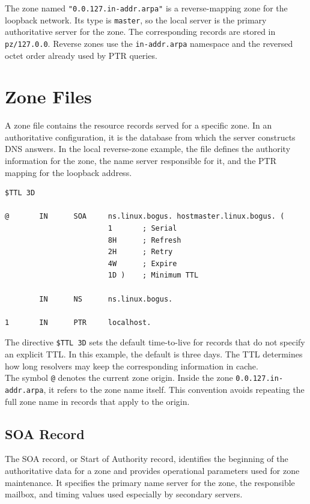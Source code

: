 \documentclass{scrbook}
\begin{document}
	The zone named \texttt{"0.0.127.in-addr.arpa"} is a reverse-mapping zone for the loopback network. Its type is \texttt{master}, so the local server is the primary authoritative server for the zone. The corresponding records are stored in \texttt{pz/127.0.0}. Reverse zones use the \texttt{in-addr.arpa} namespace and the reversed octet order already used by PTR queries.
	
	\section{Zone Files}
	
	A zone file contains the resource records served for a specific zone. In an authoritative configuration, it is the database from which the server constructs DNS answers. In the local reverse-zone example, the file defines the authority information for the zone, the name server responsible for it, and the PTR mapping for the loopback address.
	
	\begin{lstlisting}
$TTL 3D

@       IN      SOA     ns.linux.bogus. hostmaster.linux.bogus. (
                        1       ; Serial
                        8H      ; Refresh
                        2H      ; Retry
                        4W      ; Expire
                        1D )    ; Minimum TTL
	
        IN      NS      ns.linux.bogus.

1       IN      PTR     localhost.
	\end{lstlisting}
	
	The directive \texttt{\$TTL 3D} sets the default time-to-live for records that do not specify an explicit TTL. In this example, the default is three days. The TTL determines how long resolvers may keep the corresponding information in cache.\\
	
	The symbol \texttt{@} denotes the current zone origin. Inside the zone \texttt{0.0.127.in-addr.arpa}, it refers to the zone name itself. This convention avoids repeating the full zone name in records that apply to the origin.
	
	\subsection{SOA Record}
	
	The SOA record, or Start of Authority record, identifies the beginning of the authoritative data for a zone and provides operational parameters used for zone maintenance. It specifies the primary name server for the zone, the responsible mailbox, and timing values used especially by secondary servers.\\
	
\end{document}
